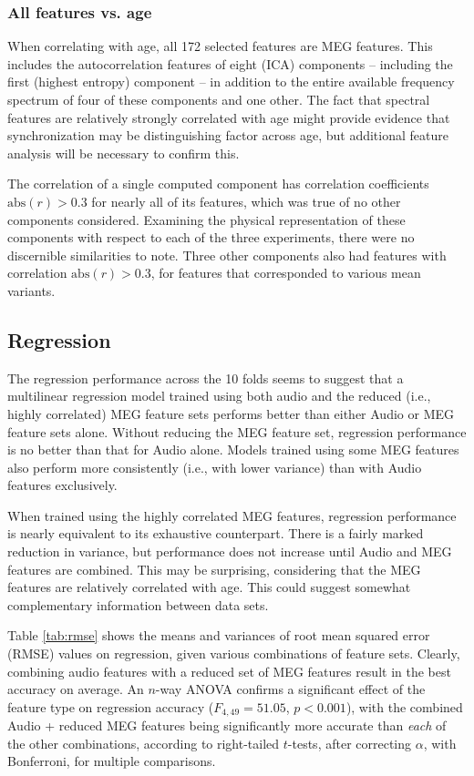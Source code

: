 \documentclass[a4paper]{article}
\begin{document}
\subsubsection{All features vs. age}

When correlating with age, all 172 selected features are MEG features. This includes the autocorrelation features of eight (ICA) components -- including the first (highest entropy) component -- in addition to the entire available frequency spectrum of four of these components and one other. The fact that spectral features are relatively strongly correlated with age might provide evidence that synchronization may be distinguishing factor across age, but additional feature analysis will be necessary to confirm this.

The correlation of a single computed component has correlation coefficients $\text{abs}(r)>0.3$ for nearly all of its features, which was true of no other components considered. Examining the physical representation of these components with respect to each of the three experiments, there were no discernible similarities to note. Three other components also had features with correlation $\text{abs}(r)>0.3$, for features that corresponded to various mean variants.

\subsection{Regression}

The regression performance across the 10 folds seems to suggest that a multilinear regression model trained using both audio and the reduced (i.e., highly correlated) MEG feature sets performs better than either Audio or MEG feature sets alone. Without  reducing the MEG feature set, regression performance is no better than that for Audio alone. Models trained using some MEG features also  perform more consistently (i.e., with lower variance) than with Audio features exclusively.

When trained using the highly correlated MEG features, regression performance is nearly equivalent to its exhaustive counterpart. There is a fairly marked reduction in variance, but performance does not increase until Audio and MEG features are combined. This may be surprising, considering that the MEG features are relatively correlated with age. This could suggest somewhat complementary information between data sets. %

Table \ref{tab:rmse} shows the means and variances of root mean squared error (RMSE) values on regression, given various combinations of feature sets. Clearly, combining audio features with a reduced set of MEG features result in the best accuracy on average. An $n$-way ANOVA confirms a significant effect of the feature type on regression accuracy ($F_{4,49} = 51.05$, $p<0.001$), with the combined Audio + reduced MEG features being significantly more accurate than {\em each} of the other combinations, according to right-tailed $t$-tests, after correcting $\alpha$, with Bonferroni, for multiple comparisons.
\end{document}
